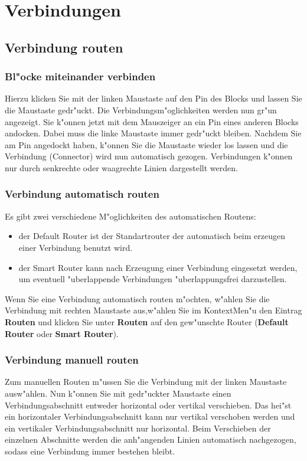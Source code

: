 \documentclass[a4paper,titlepage,12pt,ngerman]{scrbook}
\begin{document}
\section{Verbindungen}
\subsection{Verbindung routen}

\subsubsection{Bl"ocke miteinander verbinden}
Hierzu klicken Sie mit der linken Maustaste auf den Pin des Blocks und lassen Sie die Maustaste gedr"uckt. Die Verbindungsm"oglichkeiten werden nun gr"un angezeigt. Sie k"onnen jetzt mit dem Mauszeiger an ein Pin eines anderen Blocks andocken. Dabei muss die linke Maustaste immer gedr"uckt bleiben. Nachdem Sie am Pin angedockt haben, k"onnen Sie die Maustaste wieder los lassen und die Verbindung (Connector) wird nun automatisch gezogen. Verbindungen k"onnen nur durch senkrechte oder waagrechte Linien dargestellt werden.

\subsubsection{Verbindung automatisch routen}
Es gibt zwei verschiedene M"oglichkeiten des automatischen Routens:
\begin{itemize}
\item der Default Router ist der Standartrouter der automatisch beim erzeugen einer Verbindung benutzt wird.
\item der Smart Router kann nach Erzeugung einer Verbindung eingesetzt werden, um eventuell "uberlappende Verbindungen "uberlappungsfrei darzustellen.
\end{itemize}
Wenn Sie eine Verbindung automatisch routen m"ochten, w"ahlen Sie die Verbindung mit rechten Maustaste aus,w"ahlen Sie im KontextMen"u den Eintrag {\bf Routen} und klicken Sie unter {\bf Routen} auf den gew"unschte Router ({\bf Default Router} oder {\bf Smart Router}).

\subsubsection{Verbindung manuell routen}
Zum manuellen Routen m"ussen Sie die Verbindung mit der linken Maustaste ausw"ahlen. Nun k"onnen Sie mit gedr"uckter Maustaste einen Verbindungsabschnitt entweder horizontal oder vertikal verschieben. Das hei"st ein horizontaler Verbindungsabschnitt kann nur vertikal verschoben werden und ein vertikaler Verbindungsabschnitt nur horizontal. Beim Verschieben der einzelnen Abschnitte werden die anh"angenden Linien automatisch nachgezogen, sodass eine Verbindung immer bestehen bleibt.
\end{document}

